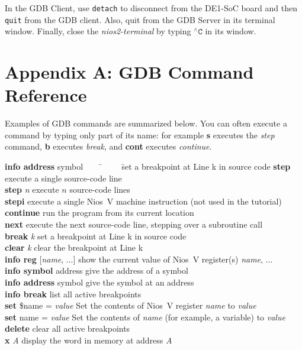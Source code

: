 \documentclass[11pt, twoside, pdftex]{article}
\begin{document}
In the GDB Client, use \texttt{detach} to disconnect from the DE1-SoC board and then
\texttt{quit} from the GDB client. Also, quit from the GDB Server in its terminal window.
Finally, close the {\it nios2-terminal} by typing $^{\wedge}\texttt{C}$ in its window.

\newpage
\section*{Appendix A: GDB Command Reference}

Examples of GDB commands are summarized below. You can often execute a command by typing
only part of its name: for example {\bf s} executes the {\it step} command, {\bf b} executes
{\it break}, and {\bf cont} executes {\it continue}.

\begin{tabbing}
{\bf info address} symbol ~~~~\= ~~~~\=set a breakpoint at Line k in source code\kill
{\bf step} \>execute a single source-code line\\
{\bf step} {\it n} \>execute $n$ source-code lines\\
{\bf stepi} \>execute a single Nios~V machine instruction (not used in the tutorial)\\
{\bf continue} \>run the program from its current location\\
{\bf next} \>execute the next source-code line, stepping over a subroutine call\\
{\bf break} {\it k} \>set a breakpoint at Line k in source code\\
{\bf clear} {\it k} \>clear the breakpoint at Line k \\
{\bf info reg} [{\it name}, $\ldots$] \>show the current value of Nios~V register(s) {\it
name}, $\ldots$\\
{\bf info symbol} address \>give the address of a symbol\\
{\bf info address} symbol \>give the symbol at an address\\
{\bf info break} \>list all active breakpoints\\
{\bf set} \$name = {\it value} \>Set the contents of Nios~V register {\it name} to {\it value}\\
{\bf set} name = {\it value} \>Set the contents of {\it name} (for example, a variable) to {\it value}\\
{\bf delete} \>clear all active breakpoints\\
{\bf x} {\it A} \>display the word in memory at address {\it A}\\

\end{tabbing}
\end{document}
